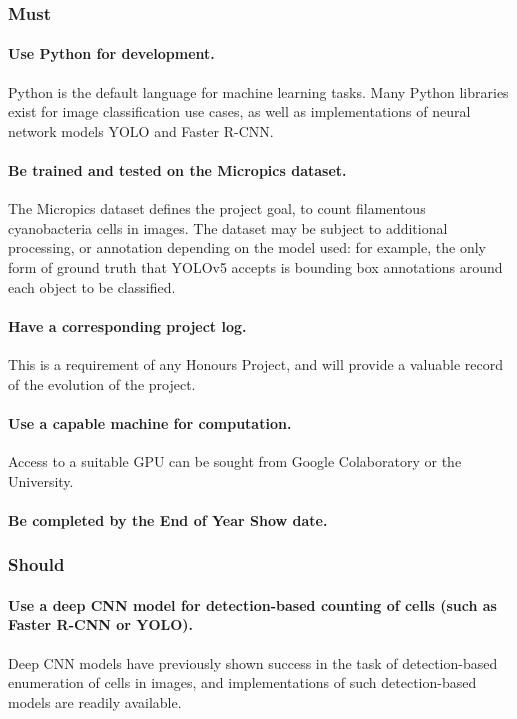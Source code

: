 \subsubsection{Must}
\paragraph{Use Python for development.}
Python is the default language for machine learning tasks.  Many Python libraries exist for image classification use cases, as well as implementations of neural network models YOLO and Faster R-CNN.

\paragraph{Be trained and tested on the Micropics dataset.}
The Micropics dataset defines the project goal, to count filamentous cyanobacteria cells in images. The dataset may be subject to additional processing, or annotation depending on the model used: for example, the only form of ground truth that YOLOv5 accepts is bounding box annotations around each object to be classified.

\paragraph{Have a corresponding project log.}
This is a requirement of any Honours Project, and will provide a valuable record of the evolution of the project.

\paragraph{Use a capable machine for computation.}
Access to a suitable GPU can be sought from Google Colaboratory or the University.

\paragraph{Be completed by the End of Year Show date.}

\subsubsection{Should}
\paragraph{Use a deep CNN model for detection-based counting of cells (such as Faster R-CNN or YOLO).}
Deep CNN models have previously shown success in the task of detection-based enumeration of cells in images, and implementations of such detection-based models are readily available.

